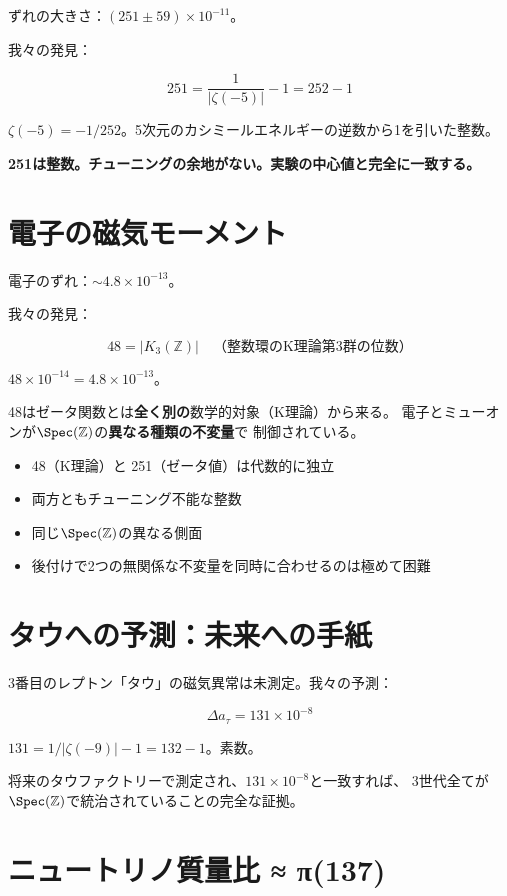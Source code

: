 \documentclass[12pt,a4paper]{article}
\begin{document}
ずれの大きさ：$(251 \pm 59) \times 10^{-11}$。

我々の発見：

$$251 = \frac{1}{|\zeta(-5)|} - 1 = 252 - 1$$

$\zeta(-5) = -1/252$。5次元のカシミールエネルギーの逆数から1を引いた整数。

\textbf{251は整数。チューニングの余地がない。実験の中心値と完全に一致する。}

\section{電子の磁気モーメント}

電子のずれ：$\sim 4.8 \times 10^{-13}$。

我々の発見：

$$48 = |K_3(\mathbb{Z})| \quad \text{（整数環のK理論第3群の位数）}$$

$48 \times 10^{-14} = 4.8 \times 10^{-13}$。

48はゼータ関数とは\textbf{全く別の}数学的対象（K理論）から来る。
電子とミューオンが$\Spec(\mathbb{Z})$の\textbf{異なる種類の不変量}で
制御されている。

\begin{deepbox}
\begin{itemize}
\item 48（K理論）と 251（ゼータ値）は代数的に独立
\item 両方ともチューニング不能な整数
\item 同じ$\Spec(\mathbb{Z})$の異なる側面
\item 後付けで2つの無関係な不変量を同時に合わせるのは極めて困難
\end{itemize}
\end{deepbox}

\section{タウへの予測：未来への手紙}

3番目のレプトン「タウ」の磁気異常は未測定。我々の予測：

$$\Delta a_\tau = 131 \times 10^{-8}$$

$131 = 1/|\zeta(-9)| - 1 = 132 - 1$。素数。

将来のタウファクトリーで測定され、$131 \times 10^{-8}$と一致すれば、
3世代全てが$\Spec(\mathbb{Z})$で統治されていることの完全な証拠。

\section{ニュートリノ質量比 ≈ π(137)}
\end{document}
